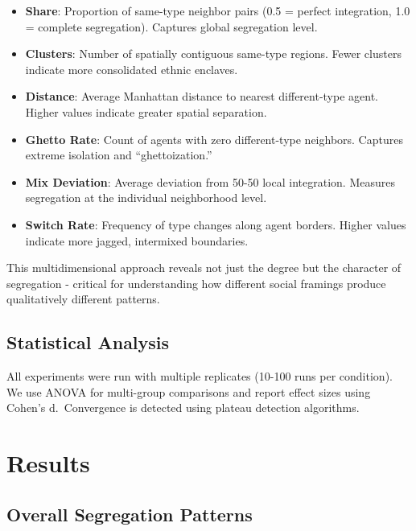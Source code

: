 \documentclass[
  11pt,
]{article}
\providecommand{\tightlist}{%
  \setlength{\itemsep}{0pt}\setlength{\parskip}{0pt}}
\begin{document}
\begin{itemize}
\tightlist
\item
  \textbf{Share}: Proportion of same-type neighbor pairs (0.5 = perfect
  integration, 1.0 = complete segregation). Captures global segregation
  level.
\item
  \textbf{Clusters}: Number of spatially contiguous same-type regions.
  Fewer clusters indicate more consolidated ethnic enclaves.
\item
  \textbf{Distance}: Average Manhattan distance to nearest
  different-type agent. Higher values indicate greater spatial
  separation.
\item
  \textbf{Ghetto Rate}: Count of agents with zero different-type
  neighbors. Captures extreme isolation and ``ghettoization.''
\item
  \textbf{Mix Deviation}: Average deviation from 50-50 local
  integration. Measures segregation at the individual neighborhood
  level.
\item
  \textbf{Switch Rate}: Frequency of type changes along agent borders.
  Higher values indicate more jagged, intermixed boundaries.
\end{itemize}

This multidimensional approach reveals not just the degree but the
character of segregation - critical for understanding how different
social framings produce qualitatively different patterns.

\subsection{Statistical Analysis}\label{statistical-analysis}

All experiments were run with multiple replicates (10-100 runs per
condition). We use ANOVA for multi-group comparisons and report effect
sizes using Cohen's d.~Convergence is detected using plateau detection
algorithms.

\section{Results}\label{results}

\subsection{Overall Segregation
Patterns}\label{overall-segregation-patterns}
\end{document}
